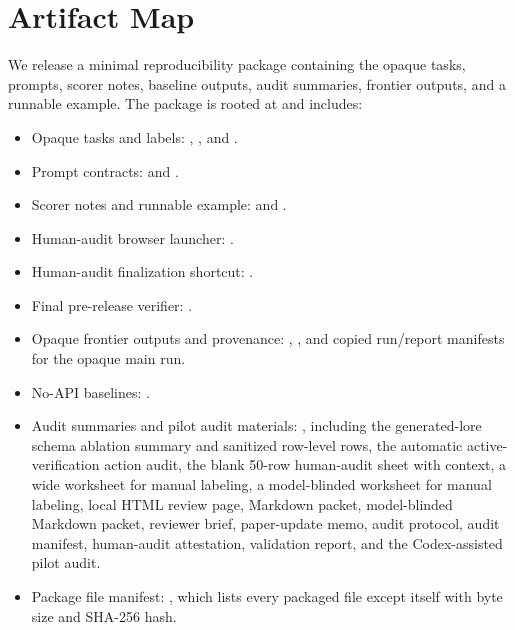 \section{Artifact Map}
\label{app:artifacts}

We release a minimal reproducibility package containing the opaque tasks, prompts, scorer notes, baseline outputs, audit summaries, frontier outputs, and a runnable example. The package is rooted at  and includes:

\begin{itemize}
    \raggedright
    \item Opaque tasks and labels: , , and .
    \item Prompt contracts:  and .
    \item Scorer notes and runnable example:  and .
    \item Human-audit browser launcher: .
    \item Human-audit finalization shortcut: .
    \item Final pre-release verifier: .
    \item Opaque frontier outputs and provenance: , , and copied run/report manifests for the opaque main run.
    \item No-API baselines: .
    \item Audit summaries and pilot audit materials: , including the generated-lore schema ablation summary and sanitized row-level rows, the automatic active-verification action audit, the blank 50-row human-audit sheet with context, a wide worksheet for manual labeling, a model-blinded worksheet for manual labeling, local HTML review page, Markdown packet, model-blinded Markdown packet, reviewer brief, paper-update memo, audit protocol, audit manifest, human-audit attestation, validation report, and the Codex-assisted pilot audit.
    \item Package file manifest: , which lists every packaged file except itself with byte size and SHA-256 hash.
\end{itemize}

